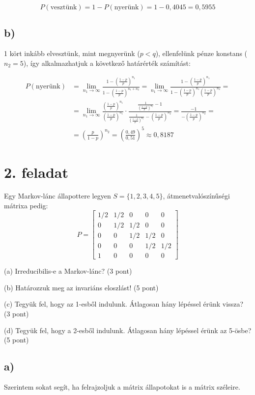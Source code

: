 \documentclass[a4paper,12pt]{article}   		%
\begin{document}
\[P(\text{vesztünk}) = 1 - P(\text{nyerünk}) = 1 - 0,4045 = 0,5955\]

\subsection*{b)}
1 kört inkább elvesztünk, mint megnyerünk ($p<q$), ellenfelünk pénze konstans
($n_2 = 5$), így alkalmazhatjuk a következő határérték számítást:

\[
\begin{split}
P(\text{nyerünk}) &= 
\lim_{n_1 \to \infty} \frac{1-\left(\frac{1-p}{p}\right)^{n_1}}
{1-\left(\frac{1-p}{p}\right)^{n_1+n_2}} =
\lim_{n_1 \to \infty} \frac{1-\left(\frac{1-p}{p}\right)^{n_1}}
{1-\left(\frac{1-p}{p}\right)^{n_1}\left(\frac{1-p}{p}\right)^{n_2}} =\\
&= \lim_{n_1 \to \infty} \frac{\left(\frac{1-p}{p}\right)^{n_1}}
{\left(\frac{1-p}{p}\right)^{n_1}} \cdot 
\frac{\frac{1}{\left(\frac{1-p}{p}\right)^{n_1}}-1}
{\frac{1}{\left(\frac{1-p}{p}\right)^{n_1}} -
\left(\frac{1-p}{p}\right)^{n_2}} 
= \frac{-1}{-\left(\frac{1-p}{p}\right)^{n_2}} =\\
&= \left(\frac{p}{1-p}\right)^{n_2} = 
\left(\frac{0,49}{0,51}\right)^{5} \approx 0,8187
\end{split}
\]

\pagebreak
\section*{2. feladat}
Egy Markov-lánc állapottere legyen $S=\{1,2,3,4,5\}$, átmenetvalószínűségi
mátrixa pedig:
\[
P = 
\begin{bmatrix}
1/2	&	1/2	&	0	&	0	&	0	\\
0	&	1/2	&	1/2	&	0	&	0	\\
0	&	0	&	1/2	&	1/2	&	0	\\
0	&	0	&	0	&	1/2	&	1/2	\\
1	&	0	&	0	&	0	&	0
\end{bmatrix}
\]

(a) Irreducibilis-e a Markov-lánc? (3 pont)

(b) Határozzuk meg az invariáns eloszlást! (5 pont)

(c) Tegyük fel, hogy az 1-esből indulunk. Átlagosan hány lépéssel érünk
vissza? (3 pont)

(d) Tegyük fel, hogy a 2-esből indulunk. Átlagosan hány lépéssel érünk
az 5-ösbe? (5 pont)

\subsection*{a)}
Szerintem sokat segít, ha felrajzoljuk a mátrix állapotokat is a mátrix
széleire.
\end{document}
